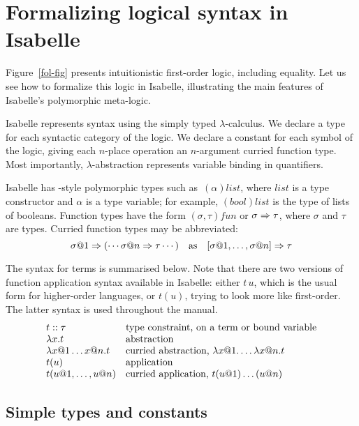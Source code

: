 \section{Formalizing logical syntax in Isabelle}\label{sec:logical-syntax}

Figure~\ref{fol-fig} presents intuitionistic first-order logic,
including equality.  Let us see how to formalize
this logic in Isabelle, illustrating the main features of Isabelle's
polymorphic meta-logic.

Isabelle represents syntax using the simply typed $\lambda$-calculus.  We
declare a type for each syntactic category of the logic.  We declare a
constant for each symbol of the logic, giving each $n$-place operation an
$n$-argument curried function type.  Most importantly,
$\lambda$-abstraction represents variable binding in quantifiers.

Isabelle has \ML-style polymorphic types such as~$(\alpha)list$, where
$list$ is a type constructor and $\alpha$ is a type variable; for example,
$(bool)list$ is the type of lists of booleans.  Function types have the
form $(\sigma,\tau)fun$ or $\sigma\Rightarrow\tau$, where $\sigma$ and $\tau$ are
types.  Curried function types may be abbreviated:
\[  \sigma@1\To (\cdots \sigma@n\To \tau\cdots)  \quad \hbox{as} \quad
[\sigma@1, \ldots, \sigma@n] \To \tau \]
 
 The syntax for terms is summarised below.
Note that there are two versions of function application syntax
available in Isabelle: either $t\,u$, which is the usual form for
higher-order languages, or $t(u)$, trying to look more like
first-order.  The latter syntax is used throughout the manual.
\[ 
\index{lambda abs@$\lambda$-abstractions}\index{function applications}
\begin{array}{ll}
  t :: \tau   & \hbox{type constraint, on a term or bound variable} \\
  \lambda x.t   & \hbox{abstraction} \\
  \lambda x@1\ldots x@n.t
        & \hbox{curried abstraction, $\lambda x@1. \ldots \lambda x@n.t$} \\
  t(u)          & \hbox{application} \\
  t (u@1, \ldots, u@n) & \hbox{curried application, $t(u@1)\ldots(u@n)$} 
\end{array}
\]


\subsection{Simple types and constants} 

